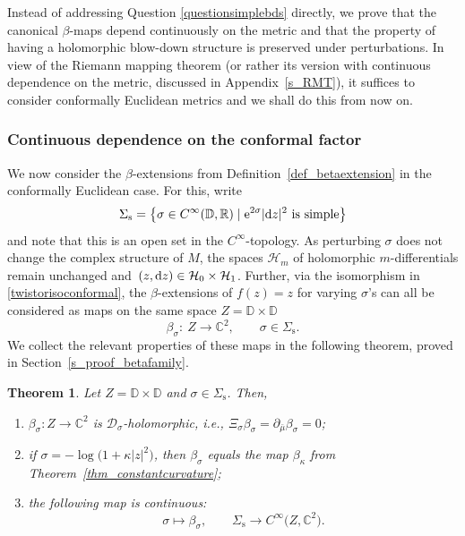 \documentclass[pdftex]{sigma}
\numberwithin{equation}{section}
\newtheorem{Theorem}{Theorem}[section]
\theoremstyle{definition}
\newcommand{\R}{\mathbb{R}} %
\newcommand{\C}{\mathbb{C}} %
\newcommand{\DD}{\mathbb{D}} %
\newcommand{\1}{{\bf 1}}
\newcommand{\D}{\mathscr{D}}
\begin{document}
Instead of addressing Question \ref{questionsimplebds} directly, we prove that the canonical $\beta$-maps depend continuously on the metric and that the property of having a holomorphic blow-down structure is preserved under perturbations. In view of the Riemann mapping theorem (or rather its version with continuous dependence on the metric, discussed in Appendix~\ref{s_RMT}), it suffices to consider conformally Euclidean metrics and we shall do this from now on.

\subsubsection{Continuous dependence on the conformal factor} We now consider the $\beta$-extensions from Definition~\ref{def_betaextension} in the conformally Euclidean case. For this, write
\[
	\Sigma_\mathrm{s} =\big\{\sigma \in C^\infty(\DD,\R)\mid {\rm e}^{2\sigma}|{\rm d}z|^2 \text{ is simple} \big\}
\]
and note that this is an open set in the $C^\infty$-topology.
As perturbing $\sigma$ does not change the complex structure of $M$, the spaces $\mathcal H_m$ of holomorphic $m$-differentials remain unchanged and~${(z,{\rm d}z)\in \mathcal H_0\times \mathcal H_1}$. Further, via the isomorphism in \eqref{twistorisoconformal}, the $\beta$-extensions of $f(z)= z$ for varying $\sigma$'s can all be considered as maps on the same space $Z=\DD\times \DD$
\[
	\beta_\sigma \colon\ Z \rightarrow \C^2,\qquad \sigma\in \Sigma_{\mathrm{s}}.
\]
We collect the relevant properties of these maps in the following theorem, proved in Section~\ref{s_proof_betafamily}.


\begin{Theorem} \label{thm_betafamily}
Let $Z=\DD\times \DD$ and $\sigma \in \Sigma_\mathrm{s}$. Then,
\begin{enumerate}[label=\rm(\roman*)]\itemsep=0pt
	\item \label{betafamily1} $\beta_\sigma\colon Z\rightarrow \C^2$ is $\D_\sigma$-holomorphic, i.e., $\Xi_\sigma \beta_\sigma= \partial_{\bar \mu} \beta_{\sigma}=0$;
	
	\item \label{betafamily2} if $\sigma=-\log\bigl(1+\kappa|z|^2\bigr)$, then $\beta_\sigma$ equals the map $\beta_\kappa$ from Theorem~{\rm\ref{thm_constantcurvature}};
	
	\item \label{betafamily3}the following map is continuous:
	\[
		\sigma\mapsto \beta_\sigma,\qquad \Sigma_\mathrm{s}\rightarrow C^\infty\bigl(Z,\C^2\bigr).
	\]
\end{enumerate}
\end{Theorem}
\end{document}
